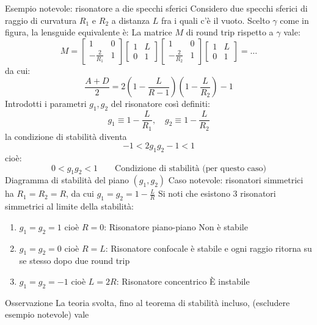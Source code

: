 \documentclass{book}
\theoremstyle{remark}
\begin{document}
Esempio notevole: risonatore a die specchi sferici
Considero due specchi sferici di raggio di curvatura $R_1$ e $R_2$ a distanza $L$ fra i quali c'è il vuoto. Scelto $\gamma$ come in figura, la lensguide equivalente è:
La matrice $M$ di round trip rispetto a $\gamma$ vale:
\begin{equation*}
M = \begin{bmatrix}
1	&	0\\
-\frac{2}{R_1}	&	1
\end{bmatrix}
\begin{bmatrix}
1	&	L\\
0	&	1
\end{bmatrix}
\begin{bmatrix}
1	&	0\\
-\frac{2}{R_2}	&	1
\end{bmatrix}
\begin{bmatrix}
1	&	L\\
0	&	1
\end{bmatrix} = \dots
\end{equation*}
da cui:
\begin{equation*}
\frac{A+D}{2} = 2(1-\frac{L}{R-1})(1-\frac{L}{R_2}) - 1
\end{equation*}
Introdotti i parametri $g_1, g_2$ del risonatore così definiti:
\begin{equation*}
g_1 \equiv 1-\frac{L}{R_1}, \quad g_2 \equiv 1-\frac{L}{R_2}
\end{equation*}
la condizione di stabilità diventa
\begin{equation*}
-1 < 2g_1 g_2 -1 <1
\end{equation*}
cioè:
\begin{equation*}
0 < g_1g_2 < 1 \qquad \text{Condizione di stabilità (per questo caso)}
\end{equation*}
Diagramma di stabilità del piano $(g_1,g_2)$
Caso notevole:
risonatori simmetrici ha $R_1=R_2=R$, da cui $g_1=g_2=1-\frac{L}{R}$
Si noti che esistono 3 risonatori simmetrici al limite della stabilità:
\begin{enumerate}
\item $g_1=g_2=1$ cioè $R=0$: Risonatore piano-piano
Non è stabile
\item $g_1=g_2=0$ cioè $R=L$: Risonatore confocale
è stabile e ogni raggio ritorna su se stesso dopo due round trip
\item $g_1=g_2 = -1$ cioè $L=2R$: Risonatore concentrico
È instabile
\end{enumerate}
Osservazione
La teoria svolta, fino al teorema di stabilità incluso, (escludere esempio notevole) vale
\end{document}
